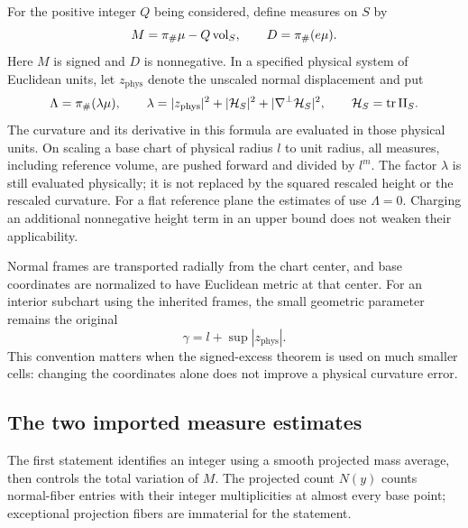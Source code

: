 For the positive integer $Q$ being considered, define measures on $S$ by
\begin{equation}\label{eq:normal-measures}
 M=\pi_\#\mu-Q\operatorname{vol}_S,\qquad D=\pi_\#(e\mu).
\end{equation}
Here $M$ is signed and $D$ is nonnegative. In a specified physical system
of Euclidean units, let $z_{\mathrm{phys}}$ denote the unscaled normal
displacement and put
\begin{equation}\label{eq:physical-error}
 \Lambda=\pi_\#(\lambda\mu),\qquad
 \lambda=|z_{\mathrm{phys}}|^2+|\mathcal H_S|^2
                       +|\nabla^\perp\mathcal H_S|^2,
 \qquad \mathcal H_S=\operatorname{tr}\mathrm{II}_S.
\end{equation}
The curvature and its derivative in this formula are evaluated in those
physical units. On scaling a base chart of physical radius $l$ to unit
radius, all measures, including reference volume, are pushed forward and
divided by $l^m$. The factor $\lambda$ is still evaluated physically; it
is not replaced by the squared rescaled height or the rescaled curvature.
For a flat reference plane the estimates of \cite{AE} use
$\Lambda=0$. Charging an additional nonnegative height term in an upper
bound does not weaken their applicability.

Normal frames are transported radially from the chart center, and base
coordinates are normalized to have Euclidean metric at that center.
For an interior subchart using the inherited frames, the small geometric
parameter remains the original
\begin{equation}\label{eq:physical-gamma}
 \gamma=l+\sup|z_{\mathrm{phys}}|.
\end{equation}
This convention matters when the signed-excess theorem is used on much
smaller cells: changing the coordinates alone does not improve a
physical curvature error.

\subsection{The two imported measure estimates}
The first statement identifies an integer using a smooth projected mass
average, then controls the total variation of $M$. The projected count
$N(y)$ counts normal-fiber entries with their integer multiplicities at
almost every base point; exceptional projection fibers are immaterial
for the statement.

